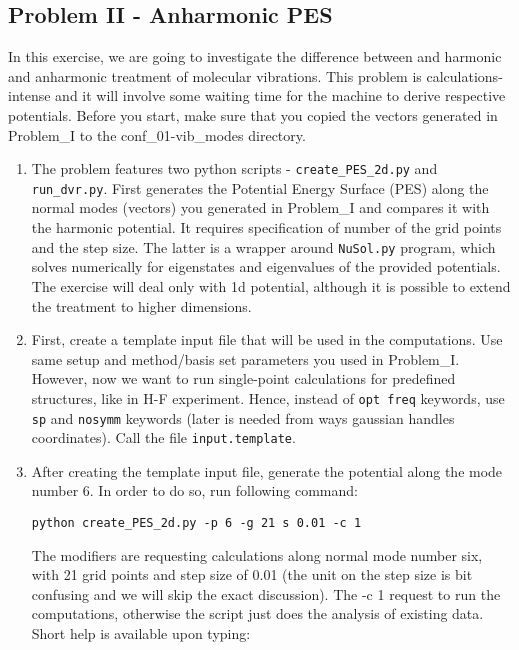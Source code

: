 \documentclass{tufte-handout}
\begin{document}
	
	
\subsection{Problem II - Anharmonic PES}

In this exercise, we are going to investigate the difference between and harmonic and anharmonic treatment of molecular vibrations. This problem is calculations-intense and it will involve some waiting time for the machine to derive respective potentials. Before you start, make sure that you copied the vectors generated in Problem\_I to the conf\_01-vib\_modes directory. 

\begin{enumerate}
 \item The problem features two python scripts - {\tt create\_PES\_2d.py} and {\tt run\_dvr.py}. First generates the Potential Energy Surface (PES) along the normal modes (vectors) you generated in Problem\_I and compares it with the harmonic potential. It requires specification of number of the grid points and the step size. The latter is a wrapper around {\tt NuSol.py} program, which solves numerically for eigenstates and eigenvalues of the provided potentials. The exercise will deal only with 1d potential, although it is possible to extend the treatment to higher dimensions. 
 
 \item First, create a template input file that will be used in the computations. Use same setup and method/basis set parameters you used in Problem\_I. However, now we want to run single-point calculations for predefined structures, like in H-F experiment. Hence, instead of {\tt opt freq} keywords, use {\tt sp} and {\tt nosymm} keywords (later is needed from ways gaussian handles coordinates). Call the file {\tt input.template}.
 
 \item After creating the template input file, generate the potential along the mode number 6. In order to do so, run following command: 
 
 {\tt python create\_PES\_2d.py -p 6 -g 21 s 0.01 -c 1} 
 
 The modifiers are requesting calculations along normal mode number six, with 21 grid points and step size of 0.01 (the unit on the step size is bit confusing and we will skip the exact discussion). The -c 1 request to run the computations, otherwise the script just does the analysis of existing data. Short help is available upon typing:
 

\end{enumerate}
\end{document}
